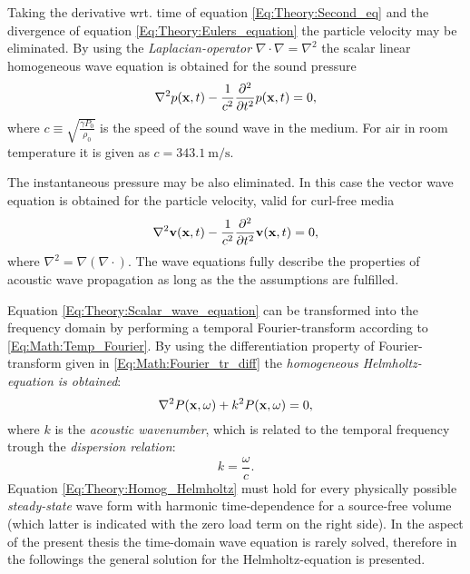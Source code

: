 %
Taking the derivative wrt. time of equation \ref{Eq:Theory:Second_eq} and the divergence of equation \ref{Eq:Theory:Eulers_equation} the particle velocity may be eliminated. By using the \emph{Laplacian-operator} $\nabla \cdot \nabla = \nabla^2$ the scalar linear homogeneous wave equation is obtained for the sound pressure
\begin{equation}
\nabla^2 p(\mathbf{x},t) - \frac{1}{c^2} \frac{\partial^2}{\partial t^2} p(\mathbf{x},t) = 0,
\label{Eq:Theory:Scalar_wave_equation}
\end{equation}
%
%
where $c \equiv \sqrt{ \frac{\gamma P_0}{\rho_0} }$ is the speed of the sound wave in the medium. For air in room temperature it is given as $c = 343.1 ~ \mathrm{m}/\mathrm{s}$.

The instantaneous pressure may be also eliminated. In this case the vector wave equation is obtained for the particle velocity, valid for curl-free media
\begin{equation}
\nabla^2 \mathbf{v}(\mathbf{x},t) - \frac{1}{c^2} \frac{\partial^2}{\partial t^2} \mathbf{v}(\mathbf{x},t) = 0,
\label{Eq:Theory:Vector_wave_equation}
\end{equation}
where $\nabla^2 = \nabla \left( \nabla \cdot \right)$.
%
The wave equations fully describe the properties of acoustic wave propagation as long as the the assumptions are fulfilled.
%

\vspace{3mm}
%
Equation \eqref{Eq:Theory:Scalar_wave_equation} can be transformed into the frequency domain by performing a temporal Fourier-transform according to \eqref{Eq:Math:Temp_Fourier}. By using the differentiation property of Fourier-transform given in \eqref{Eq:Math:Fourier_tr_diff} the \emph{homogeneous Helmholtz-equation is obtained}:
\begin{equation}
\nabla^2 P(\mathbf{x},\omega) + k^2 P(\mathbf{x},\omega) = 0,
\label{Eq:Theory:Homog_Helmholtz}
\end{equation}
where $k$ is the \emph{acoustic wavenumber}, which is related to the temporal frequency trough the \emph{dispersion relation}:
\begin{equation}
k = \frac{\omega}{c}.
\end{equation}
%
Equation \eqref{Eq:Theory:Homog_Helmholtz} must hold for every physically possible \emph{steady-state} wave form with harmonic time-dependence for a source-free volume (which latter is indicated with the zero load term on the right side). In the aspect of the present thesis the time-domain wave equation is rarely solved, therefore in the followings the general solution for the Helmholtz-equation is presented.

